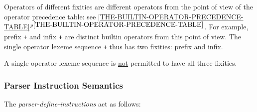 \documentclass[12pt]{article}
\newcommand{\itemref}[1]{\ref{#1}$^{p\pageref{#1}}$}
\begin{document}
Operators of different fixities are different operators from the point
of view of the operator precedence table:
see \itemref{THE-BUILTIN-OPERATOR-PRECEDENCE-TABLE}.  For example,
prefix {\tt +} and infix {\tt +} are distinct builtin operators from
this point of view.  The single operator lexeme sequence {\tt +} thus
has two fixities: prefix and infix.

A single operator lexeme sequence is \underline{not} permitted to have
all three fixities.

\subsubsection{Parser Instruction Semantics}
\label{PARSER-INSTRUCTION-SEMANTICS}

The {\em parser-define-instructions} act as follows:
\end{document}
